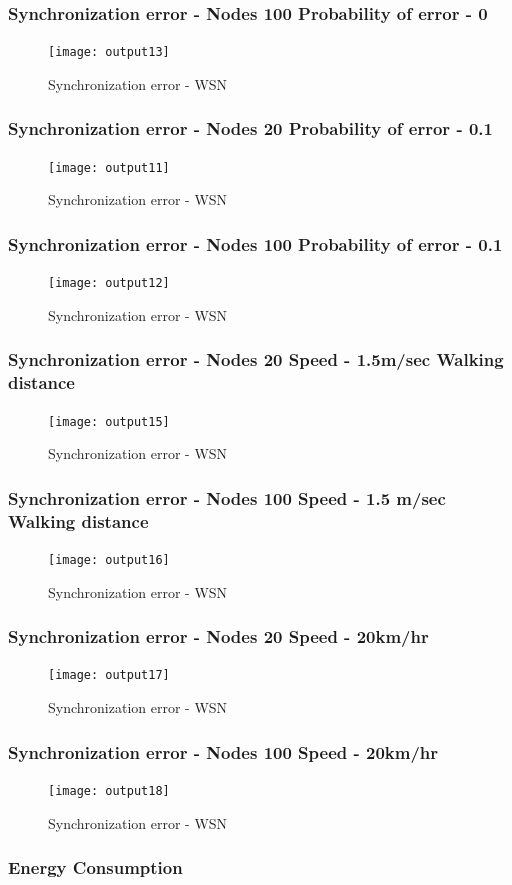 \documentclass[t]{beamer}
\begin{document}
\begin{frame}
    \frametitle{Synchronization error - Nodes 100 Probability of error - 0}
    \begin{figure}
    \centering
    \texttt{[image: output13]}
    \caption{Synchronization error - WSN}
    \end{figure}
\end{frame}

\begin{frame}
    \frametitle{Synchronization error - Nodes 20 Probability of error - 0.1  }
    \begin{figure}
    \centering
    \texttt{[image: output11]}
    \caption{Synchronization error - WSN}
    \end{figure}
\end{frame}
\begin{frame}
    \frametitle{Synchronization error - Nodes 100 Probability of error - 0.1}
    \begin{figure}
    \centering
    \texttt{[image: output12]}
    \caption{Synchronization error - WSN}
    \end{figure}
\end{frame}
\begin{frame}
    \frametitle{Synchronization error - Nodes 20 Speed - 1.5m/sec Walking distance}
    \begin{figure}
    \centering
    \texttt{[image: output15]}
    \caption{Synchronization error - WSN}
    \end{figure}
\end{frame}\begin{frame}
    \frametitle{Synchronization error - Nodes 100 Speed - 1.5 m/sec Walking distance}
    \begin{figure}
    \centering
    \texttt{[image: output16]}
    \caption{Synchronization error - WSN}
    \end{figure}
\end{frame}\begin{frame}
    \frametitle{Synchronization error - Nodes 20 Speed - 20km/hr}
    \begin{figure}
    \centering
    \texttt{[image: output17]}
    \caption{Synchronization error - WSN}
    \end{figure}
\end{frame}\begin{frame}
    \frametitle{Synchronization error - Nodes 100 Speed - 20km/hr}
    \begin{figure}
    \centering
    \texttt{[image: output18]}
    \caption{Synchronization error - WSN}
    \end{figure}
\end{frame}
\begin{frame}
\frametitle{Energy Consumption}
\end{frame}
\end{document}
